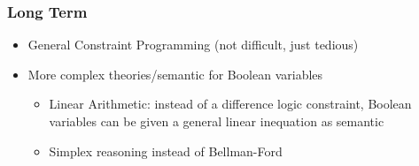 \begin{frame}
\frametitle{Long Term}

\vfill\pause
\begin{itemize}
	\item General Constraint Programming (not difficult, just tedious)

	\vfill\pause
	\item More complex theories/semantic for Boolean variables

	\vfill\pause
	\begin{itemize}
		\item Linear Arithmetic: instead of a difference logic constraint, Boolean variables can be given a general linear inequation as semantic

		\vfill
		\item Simplex reasoning instead of Bellman-Ford
	\end{itemize}
\end{itemize}

\vfill

\end{frame}
